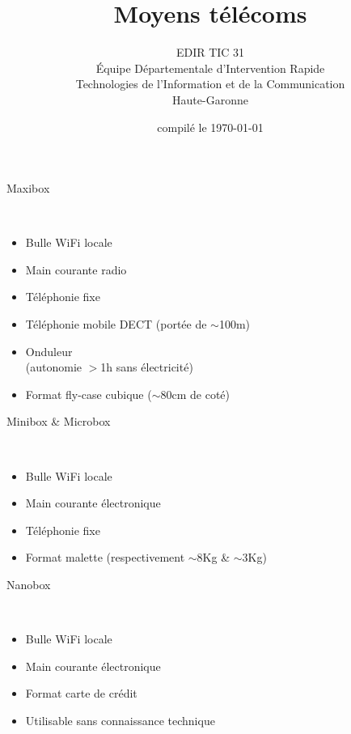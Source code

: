 \documentclass{beamer}
\begin{document}
\date{compilé le \today}
\title{Moyens télécoms}
\author{
	EDIR TIC 31\\
	\small{
        Équipe Départementale d’Intervention Rapide\\
        Technologies de l’Information et de la Communication\\
        Haute-Garonne
    }
}

\begin{frame}
	\titlepage
\end{frame}

\begin{frame}
    \begin{huge}Maxibox\end{huge}
    \vspace{0.5cm}
    \\
    \begin{itemize}
        \item Bulle WiFi locale
        \item Main courante radio
        \item Téléphonie fixe
        \item Téléphonie mobile DECT (portée de $\sim$100m)
        \item Onduleur \\ (autonomie $>$1h sans électricité)
        \item Format fly-case cubique ($\sim$80cm de coté)
    \end{itemize}
\end{frame}

\begin{frame}
    \begin{huge}Minibox \& Microbox\end{huge}
    \vspace{0.5cm}
    \\
    \begin{itemize}
        \item Bulle WiFi locale
        \item Main courante électronique
        \item Téléphonie fixe
        \item Format malette (respectivement $\sim$8Kg \& $\sim$3Kg)
    \end{itemize}
\end{frame}

\begin{frame}
    \begin{huge}Nanobox\end{huge}
    \vspace{0.5cm}
    \\
    \begin{itemize}
        \item Bulle WiFi locale
        \item Main courante électronique
        \item Format carte de crédit
        \item Utilisable sans connaissance technique
    \end{itemize}
\end{frame}
\end{document}

